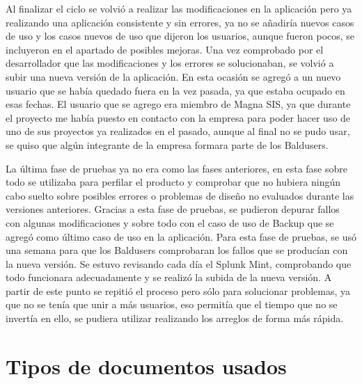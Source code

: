 Al finalizar el ciclo se volvió a realizar las modificaciones en la aplicación pero ya realizando una aplicación consistente y sin errores, ya no se añadiría nuevos casos de uso y los casos nuevos de uso que dijeron los usuarios, aunque fueron pocos, se incluyeron en el apartado de posibles mejoras.
Una vez comprobado por el desarrollador que las modificaciones y los errores se solucionaban, se volvió a subir una nueva versión de la aplicación. En esta ocasión se agregó a un nuevo usuario que se había quedado fuera en la vez pasada, ya que estaba ocupado en esas fechas.
El usuario que se agrego era miembro de Magna SIS, ya que durante el proyecto me había puesto en contacto con la empresa para poder hacer uso de uno de sus proyectos ya realizados en el pasado, aunque al final no se pudo usar, se quiso que algún integrante de la empresa formara parte de los Baldusers.

La última fase de pruebas ya no era como las fases anteriores, en esta fase sobre todo se utilizaba para perfilar el producto y comprobar que no hubiera ningún cabo suelto sobre posibles errores o problemas de diseño no evaluados durante las versiones anteriores.
Gracias a esta fase de pruebas, se pudieron depurar fallos con algunas modificaciones y sobre todo con el caso de uso de Backup que se agregó como último caso de uso en la aplicación.
Para esta fase de pruebas, se usó una semana para que los Baldusers comprobaran los fallos que se producían con la nueva versión.
Se estuvo revisando cada día el Splunk Mint, comprobando que todo funcionara adecuadamente y se realizó la subida de la nueva versión.
A partir de este punto se repitió el proceso pero sólo para solucionar problemas, ya que no se tenía que unir a más usuarios, eso permitía que el tiempo que no se invertía en ello, se pudiera utilizar realizando los arreglos de forma más rápida.



\section{Tipos de documentos usados}
\label{secc:tipos de documentos usados}

